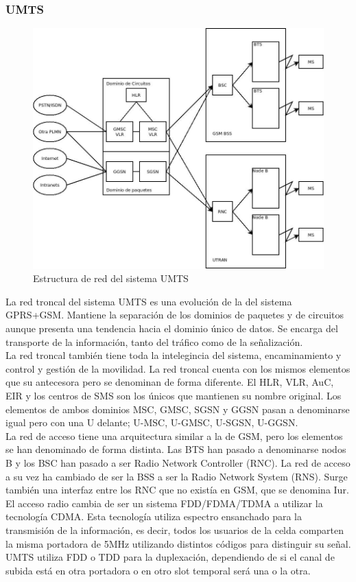 \subsubsection{\acrshort{UMTS}}
\label{ssub:UMTS}
\begin{figure}[H]
\centering
\includegraphics[width=\textwidth]{Imagen/diaUMTS.jpg}
\caption{Estructura de red del sistema \acrshort{UMTS}}
\label{img:UMTS}
\end{figure}
La red troncal del sistema \acrshort{UMTS} es una evolución de la del sistema \acrshort{GPRS}+\acrshort{GSM}. Mantiene la separación de los dominios de paquetes y de circuitos aunque presenta una tendencia hacia el dominio único de datos. Se encarga del transporte de la información, tanto del tráfico como de la señalización.\\
La red troncal también tiene toda la intelegincia del sistema, encaminamiento y control y gestión de la movilidad. La red troncal cuenta con los mismos elementos que su antecesora pero se denominan de forma diferente. El \acrshort{HLR}, \acrshort{VLR}, AuC, \acrshort{EIR} y los centros de SMS son los únicos que mantienen su nombre original. Los elementos de ambos dominios MSC, GMSC, SGSN y GGSN pasan a denominarse igual pero con una U delante; U-MSC, U-GMSC, U-SGSN, U-GGSN.\\
La red de acceso tiene una arquitectura similar a la de \acrshort{GSM}, pero los elementos se han denominado de forma distinta. Las \acrshort{BTS} han pasado a denominarse nodos B y los \acrshort{BSC} han pasado a ser Radio Network Controller (\acrshort{RNC}). La red de acceso a su vez ha cambiado de ser la BSS a ser la Radio Network System (\acrshort{RNS}). Surge también una interfaz entre los \acrshort{RNC} que no existía en \acrshort{GSM}, que se denomina Iur. El acceso radio cambia de ser un sistema \acrshort{FDD}/\acrshort{FDMA}/\acrshort{TDMA} a utilizar la tecnología CDMA. Esta tecnología utiliza espectro ensanchado para la transmisión de la información, es decir, todos los usuarios de la celda comparten la misma portadora de 5MHz utilizando distintos códigos para distinguir su señal. \acrshort{UMTS} utiliza \acrshort{FDD} o \acrshort{TDD} para la duplexación, dependiendo de si el canal de subida está en otra portadora o en otro slot temporal será una o la otra.

